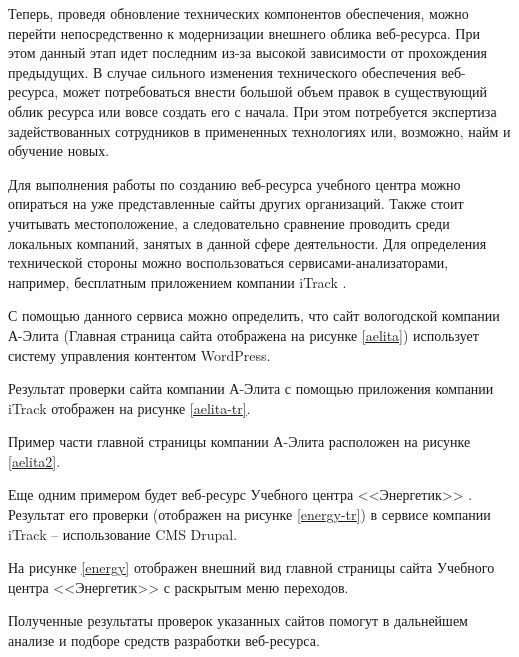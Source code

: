 Теперь, проведя обновление технических компонентов обеспечения, можно перейти непосредственно к модернизации внешнего облика веб-ресурса.
При этом данный этап идет последним из-за высокой зависимости от прохождения предыдущих.
В случае сильного изменения технического обеспечения веб-ресурса, может потребоваться внести большой объем правок в существующий облик ресурса или вовсе создать его с начала.
При этом потребуется экспертиза задействованных сотрудников в примененных технологиях или, возможно, найм и обучение новых.

Для выполнения работы по созданию веб-ресурса учебного центра можно опираться на уже представленные сайты других организаций.
Также стоит учитывать местоположение, а следовательно сравнение проводить среди локальных компаний, занятых в данной сфере деятельности.
Для определения технической стороны можно воспользоваться сервисами-анализаторами, например, бесплатным приложением компании iTrack \cite{iTrack}.

С помощью данного сервиса можно определить, что сайт вологодской компании А-Элита \cite{aelita} (Главная страница сайта отображена на рисунке \ref{aelita}) использует систему управления контентом WordPress.


Результат проверки сайта компании А-Элита с помощью приложения компании iTrack отображен на рисунке \ref{aelita-tr}.


Пример части главной страницы компании А-Элита расположен на рисунке \ref{aelita2}.


Еще одним примером будет веб-ресурс Учебного центра <<Энергетик>> \cite{energy}.
Результат его проверки (отображен на рисунке \ref{energy-tr}) в сервисе компании iTrack -- использование CMS Drupal.


На рисунке \ref{energy} отображен внешний вид главной страницы сайта Учебного центра <<Энергетик>> с раскрытым меню переходов.


Полученные результаты проверок указанных сайтов помогут в дальнейшем анализе и подборе средств разработки веб-ресурса.

\clearpage
